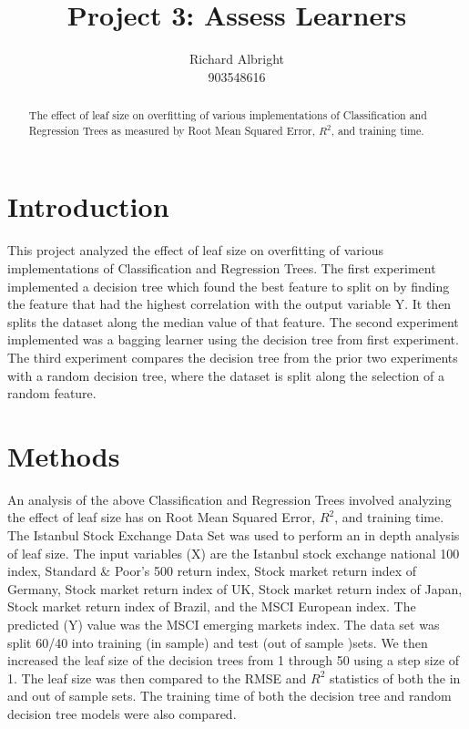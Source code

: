 \documentclass[
	letterpaper, %
]{jdf}
\author{
	Richard Albright \\
	903548616}
\title{Project 3: Assess Learners}
\begin{document}

\maketitle

\begin{abstract}
The effect of leaf size on overfitting of various implementations of Classification and Regression Trees as measured by Root Mean Squared Error, $R^{2}$, and training time.
\end{abstract}

\section{Introduction}
This project analyzed the effect of leaf size on overfitting of various implementations of Classification and Regression Trees. The first experiment implemented a decision tree which found the best feature to split on by finding the feature that had the highest correlation with the output variable Y.  It then splits the dataset along the median value of that feature.  The second experiment implemented was a bagging learner using the decision tree from first experiment. The third experiment compares the decision tree from the prior two experiments with a random decision tree, where the dataset is split along the selection of a random feature.

\section{Methods}
An analysis of the above Classification and Regression Trees involved analyzing the effect of leaf size has on Root Mean Squared Error, $R^{2}$, and training time.  The Istanbul Stock Exchange Data Set was used to perform an in depth analysis of leaf size. The input variables (X) are the Istanbul stock exchange national 100 index, Standard \& Poor's 500 return index, Stock market return index of Germany, Stock market return index of UK, Stock market return index of Japan, Stock market return index of Brazil, and the MSCI European index. The predicted (Y) value was the MSCI emerging markets index.  The data set was split 60/40 into training (in sample) and test (out of sample
)sets. We then increased the leaf size of the decision trees from 1 through 50 using a step size of 1. The leaf size was then compared to the RMSE and $R^{2}$ statistics of both the in and out of sample sets. The training time of both the decision tree and random decision tree models were also compared.
\end{document}
